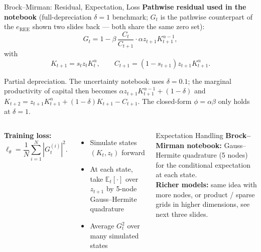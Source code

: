 \documentclass[aspectratio=169,11pt]{beamer}
\newcommand{\emphc}[1]{\textcolor{harvardcrimson}{#1}}
\begin{document}
\begin{frame}[shrink=20]{Brock--Mirman: Residual, Expectation, Loss}
\textbf{Pathwise residual used in the notebook} (full-depreciation $\delta=1$ benchmark; $G_t$ is the pathwise counterpart of the $e_{\mathrm{REE}}$ shown two slides back --- both share the same zero set):
\[
G_t = 1 - \beta \, \frac{C_t}{C_{t+1}} \cdot \alpha z_{t+1} K_{t+1}^{\alpha-1},
\]
with
\[
K_{t+1} = s_t z_t K_t^\alpha, \qquad
C_{t+1} = (1-s_{t+1}) z_{t+1} K_{t+1}^\alpha.
\]

\vspace{-0.4em}
{\scriptsize\emphc{Partial depreciation.}  The uncertainty notebook uses $\delta=0.1$; the marginal productivity of capital then becomes $\alpha z_{t+1} K_{t+1}^{\alpha-1} + (1-\delta)$ and $K_{t+2} = z_{t+1} K_{t+1}^{\alpha} + (1-\delta) K_{t+1} - C_{t+1}$.  The closed-form $\phi = \alpha\beta$ only holds at $\delta=1$.}

\vspace{0.1em}
\begin{columns}[T]
\textbf{Training loss:}
\[
\ell_\theta = \frac{1}{N}\sum_{i=1}^{N} |G_t^{(i)}|^2.
\]

\begin{itemize}
    \setlength{\itemsep}{1pt}
    \item Simulate states $(K_t,z_t)$ forward
    \item At each state, take $\mathbb{E}_t[\cdot]$ over $z_{t+1}$ by 5-node Gauss--Hermite quadrature
    \item Average $G_t^2$ over many simulated states
\end{itemize}

\begin{block}{Expectation Handling}
\small
\textbf{Brock--Mirman notebook:} \emphc{Gauss--Hermite quadrature} (5 nodes) for the conditional expectation at each state.\\[2pt]
\textbf{Richer models:} same idea with more nodes, or product / sparse grids in higher dimensions, see next three slides.
\end{block}
\end{columns}
\end{frame}

\end{document}
